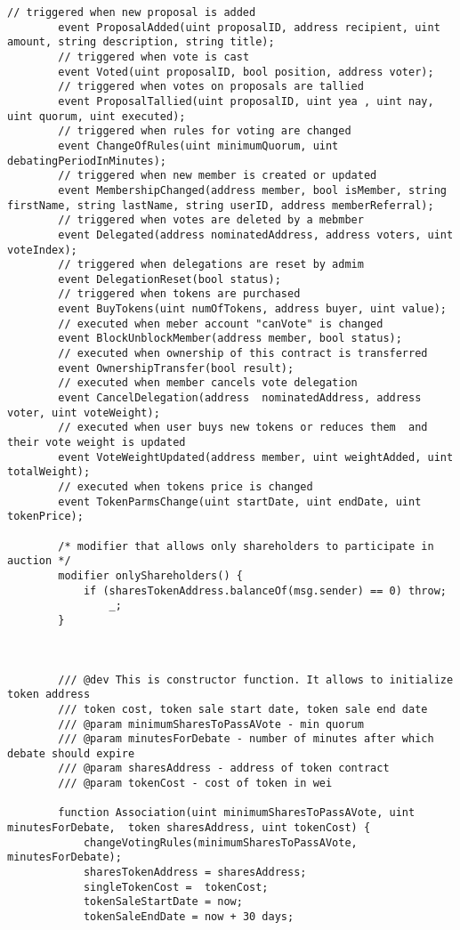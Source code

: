 \documentclass{article}
\begin{document}
\begin{lstlisting}[style=MyCStyle]
        // triggered when new proposal is added
        event ProposalAdded(uint proposalID, address recipient, uint amount, string description, string title);
        // triggered when vote is cast
        event Voted(uint proposalID, bool position, address voter);
        // triggered when votes on proposals are tallied
        event ProposalTallied(uint proposalID, uint yea , uint nay, uint quorum, uint executed);
        // triggered when rules for voting are changed
        event ChangeOfRules(uint minimumQuorum, uint debatingPeriodInMinutes);
        // triggered when new member is created or updated
        event MembershipChanged(address member, bool isMember, string firstName, string lastName, string userID, address memberReferral);
        // triggered when votes are deleted by a mebmber
        event Delegated(address nominatedAddress, address voters, uint voteIndex);
        // triggered when delegations are reset by admim
        event DelegationReset(bool status);
        // triggered when tokens are purchased
        event BuyTokens(uint numOfTokens, address buyer, uint value);
        // executed when meber account "canVote" is changed
        event BlockUnblockMember(address member, bool status);
        // executed when ownership of this contract is transferred
        event OwnershipTransfer(bool result);
        // executed when member cancels vote delegation
        event CancelDelegation(address  nominatedAddress, address voter, uint voteWeight);
        // executed when user buys new tokens or reduces them  and their vote weight is updated
        event VoteWeightUpdated(address member, uint weightAdded, uint totalWeight);
        // executed when tokens price is changed
        event TokenParmsChange(uint startDate, uint endDate, uint tokenPrice);

        /* modifier that allows only shareholders to participate in auction */
        modifier onlyShareholders() {
            if (sharesTokenAddress.balanceOf(msg.sender) == 0) throw;
                _;
        }



        /// @dev This is constructor function. It allows to initialize token address
        /// token cost, token sale start date, token sale end date
        /// @param minimumSharesToPassAVote - min quorum
        /// @param minutesForDebate - number of minutes after which debate should expire
        /// @param sharesAddress - address of token contract
        /// @param tokenCost - cost of token in wei

        function Association(uint minimumSharesToPassAVote, uint minutesForDebate,  token sharesAddress, uint tokenCost) {
            changeVotingRules(minimumSharesToPassAVote, minutesForDebate);
            sharesTokenAddress = sharesAddress;
            singleTokenCost =  tokenCost;
            tokenSaleStartDate = now;
            tokenSaleEndDate = now + 30 days;


\end{lstlisting}
\end{document}
